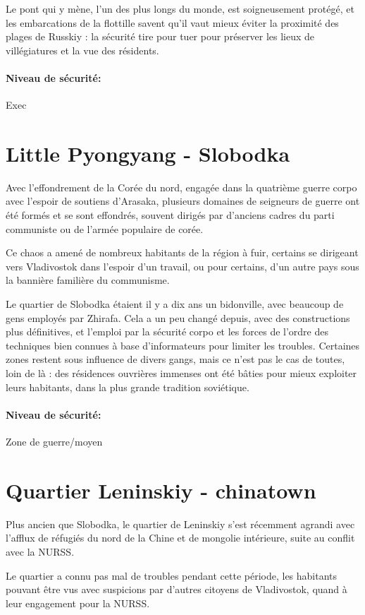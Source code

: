 \documentclass[10pt,a4paper]{book}
\begin{document}
Le pont qui y mène, l'un des plus longs du monde, est soigneusement protégé, et les embarcations de la flottille savent qu'il vaut mieux éviter la proximité des plages de Russkiy : la sécurité tire pour tuer pour préserver les lieux de villégiatures et la vue des résidents.
\paragraph{Niveau de sécurité:}Exec
\section{Little Pyongyang - Slobodka}
Avec l'effondrement de la Corée du nord, engagée dans la quatrième guerre corpo avec l'espoir de soutiens d'Arasaka, plusieurs domaines de seigneurs de guerre ont été formés et se sont effondrés, souvent dirigés par d'anciens cadres du parti communiste ou de l'armée populaire de corée.

Ce chaos a amené de nombreux habitants de la région à fuir, certains se dirigeant vers Vladivostok dans l'espoir d'un travail, ou pour certains, d'un autre pays sous la bannière familière du communisme.

Le quartier de Slobodka étaient il y a dix ans un bidonville, avec beaucoup de gens employés par Zhirafa. Cela a un peu changé depuis, avec des constructions plus définitives,  et l'emploi par la sécurité corpo et les forces de l'ordre des techniques bien connues à base d'informateurs pour limiter les troubles. Certaines zones restent sous influence de divers gangs, mais ce n'est pas le cas de toutes, loin de là : des résidences ouvrières immenses ont été bâties pour mieux exploiter leurs habitants, dans la plus grande tradition soviétique.
\paragraph{Niveau de sécurité:}Zone de guerre/moyen
\section{Quartier Leninskiy - chinatown}
Plus ancien que Slobodka, le quartier de Leninskiy s'est récemment agrandi avec l'afflux de réfugiés du nord de la Chine et de mongolie intérieure, suite au conflit avec la NURSS. 

Le quartier a connu pas mal de troubles pendant cette période, les habitants pouvant être vus avec suspicions par d'autres citoyens de Vladivostok, quand à leur engagement pour la NURSS.
\end{document}
